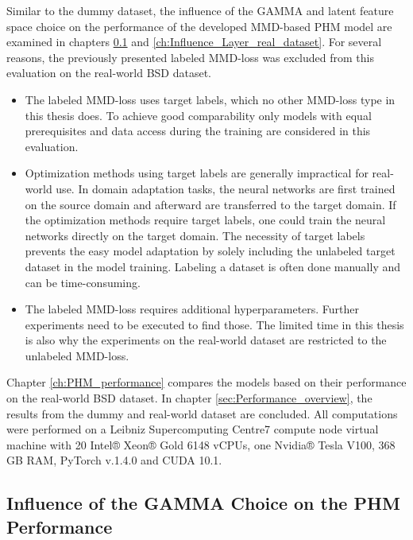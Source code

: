 Similar to the dummy dataset, the influence of the GAMMA and latent feature space choice on the performance of the developed MMD-based PHM model are examined in chapters \ref{ch:Influence_GAMMA_real_dataset} and \ref{ch:Influence_Layer_real_dataset}. For several reasons, the previously presented labeled MMD-loss was excluded from this evaluation on the real-world BSD dataset. 
\begin{itemize}
    \item The labeled MMD-loss uses target labels, which no other MMD-loss type in this thesis does. To achieve good comparability only models with equal prerequisites and data access during the training are considered in this evaluation.
    \item Optimization methods using target labels are generally impractical for real-world use. In domain adaptation tasks, the neural networks are first trained on the source domain and afterward are transferred to the target domain. If the optimization methods require target labels, one could train the neural networks directly on the target domain. The necessity of target labels prevents the easy model adaptation by solely including the unlabeled target dataset in the model training. Labeling a dataset is often done manually and can be time-consuming.
    \item The labeled MMD-loss requires additional hyperparameters. Further experiments need to be executed to find those. The limited time in this thesis is also why the experiments on the real-world dataset are restricted to the unlabeled MMD-loss. 
\end{itemize}

Chapter \ref{ch:PHM_performance} compares the models based on their performance on the real-world BSD dataset. In chapter \ref{sec:Performance_overview}, the results from the dummy and real-world dataset are concluded. All computations were performed on a Leibniz Supercomputing Centre7 compute node virtual machine with 20 Intel® Xeon® Gold 6148 vCPUs, one Nvidia® Tesla V100, 368 GB RAM, PyTorch v.1.4.0 and CUDA 10.1.


\subsection{Influence of the GAMMA Choice on the PHM Performance}\label{ch:Influence_GAMMA_real_dataset}

